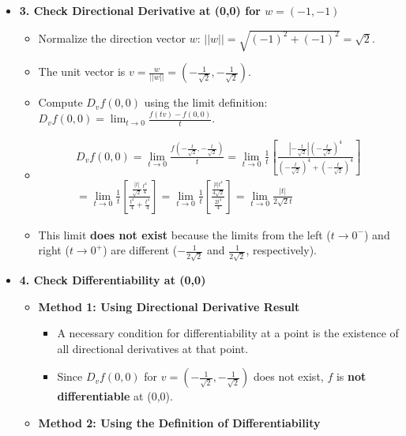 \begin{cascade}
\begin{itemize}
		\item \textbf{3. Check Directional Derivative at (0,0) for $w=(-1,-1)$}
		      \begin{itemize}
			      \item Normalize the direction vector $w$: $||w|| = \sqrt{(-1)^2+(-1)^2} = \sqrt{2}$.
			      \item The unit vector is $v = \frac{w}{||w||} = \left(-\frac{1}{\sqrt{2}}, -\frac{1}{\sqrt{2}}\right)$.
			      \item Compute $D_v f(0,0)$ using the limit definition: $D_v f(0,0) = \lim_{t\to 0} \frac{f(tv) - f(0,0)}{t}$.
			      \item \begin{align*}
				            D_v f(0,0) = \lim_{t\to 0} \frac{f(-\frac{t}{\sqrt{2}}, -\frac{t}{\sqrt{2}})}{t} = \lim_{t\to 0} \frac{1}{t} \left[ \frac{|-\frac{t}{\sqrt{2}}|(-\frac{t}{\sqrt{2}})^4}{(-\frac{t}{\sqrt{2}})^4 + (-\frac{t}{\sqrt{2}})^4} \right] \\
				            = \lim_{t\to 0} \frac{1}{t} \left[ \frac{\frac{|t|}{\sqrt{2}} \frac{t^4}{4}}{\frac{t^4}{4} + \frac{t^4}{4}} \right] = \lim_{t\to 0} \frac{1}{t} \left[ \frac{\frac{|t|t^4}{4\sqrt{2}}}{\frac{2t^4}{4}} \right] = \lim_{t\to 0} \frac{|t|}{2\sqrt{2} t}
			            \end{align*}
			      \item This limit \textbf{does not exist} because the limits from the left ($t \to 0^-$) and right ($t \to 0^+$) are different ($-\frac{1}{2\sqrt{2}}$ and $\frac{1}{2\sqrt{2}}$, respectively).
		      \end{itemize}
		\item \textbf{4. Check Differentiability at (0,0)}
		      \begin{itemize}
			      \item \textbf{Method 1: Using Directional Derivative Result}
			            \begin{itemize}
				            \item A necessary condition for differentiability at a point is the existence of all directional derivatives at that point.
				            \item Since $D_v f(0,0)$ for $v=(-\frac{1}{\sqrt{2}}, -\frac{1}{\sqrt{2}})$ does not exist, $f$ is \textbf{not differentiable} at (0,0).
			            \end{itemize}
			      \item \textbf{Method 2: Using the Definition of Differentiability}
			            \begin{itemize}

\end{itemize}
\end{itemize}
\end{itemize}
\end{cascade}
